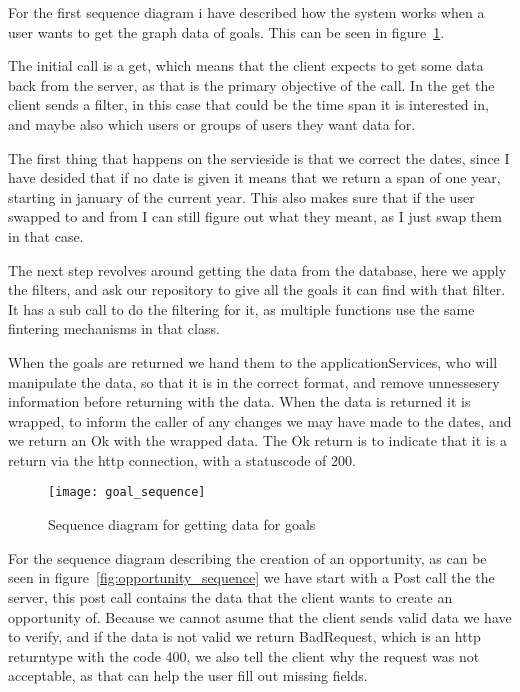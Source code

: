 For the first sequence diagram i have described how the system works when a user
wants to get the graph data of goals. This can be seen in
figure~\ref{fig:goal_sequence}.

The initial call is a get, which means that the client expects to get some data
back from the server, as that is the primary objective of the call. In the get
the client sends a filter, in this case that could be the time span it is
interested in, and maybe also which users or groups of users they want data for.

The first thing that happens on the servieside is that we correct the dates,
since I have desided that if no date is given it means that we return a span of
one year, starting in january of the current year. This also makes sure that if
the user swapped to and from I can still figure out what they meant, as I just
swap them in that case. 

The next step revolves around getting the data from the database, here we apply
the filters, and ask our repository to give all the goals it can find with that
filter. It has a sub call to do the filtering for it, as multiple functions use
the same fintering mechanisms in that class.

When the goals are returned we hand them to the applicationServices, who will
manipulate the data, so that it is in the correct format, and remove unnessesery
information before returning with the data. When the data is returned it is
wrapped, to inform the caller of any changes we may have made to the dates, and
we return an Ok with the wrapped data. The Ok return is to indicate that it is a
return via the http connection, with a statuscode of 200.

\begin{figure}[!htbp]
\centering
\texttt{[image: goal\_sequence]}
\caption{Sequence diagram for getting data for goals}
\label{fig:goal_sequence}
\end{figure}

For the sequence diagram describing the creation of an opportunity, as can be
seen in figure~\ref{fig:opportunity_sequence} we have start with a Post call the
the server, this post call contains the data that the client wants to create an
opportunity of. Because we cannot asume that the client sends valid data we have
to verify, and if the data is not valid we return BadRequest, which is an http
returntype with the code 400, we also tell the client why the request was not
acceptable, as that can help the user fill out missing fields.


